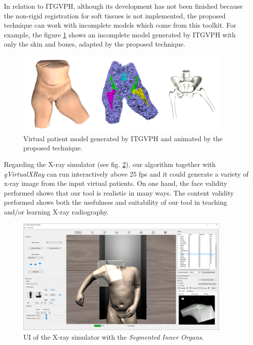    
In relation to ITGVPH, although its development has not been finished because the non-rigid registration for soft tissues is not implemented, the proposed technique can work with incomplete models which come from this toolkit. For example, the figure \ref{fig:summarypatient} shows an incomplete model generated by ITGVPH with only the skin and bones, adapted by the proposed technique.
\begin{figure}[htbp]
    \centering
    \includegraphics[width=0.95\textwidth]{IMG/spatient.png}
    \caption{Virtual patient model generated by ITGVPH and animated by the proposed technique.}
    \label{fig:summarypatient}
\end{figure}

Regarding the X-ray simulator (see fig. \ref{fig:summaryxray}), our algorithm together with \emph{gVirtualXRay} can run interactively above 25 fps and it could generate a variety of x-ray image from the input virtual patients.  On one hand, the face validity performed shows that our tool is realistic in many ways.
The content validity performed shows both the usefulness and suitability of our tool in teaching and/or learning X-ray radiography. 
\begin{figure}[htbp]
    \centering
    \includegraphics[width=0.95\textwidth]{IMG/suiteacher.png}
    \caption{UI of the X-ray simulator with the \emph{Segmented Inner Organs}\cite{VoxelMan}.}
    \label{fig:summaryxray}
\end{figure}

